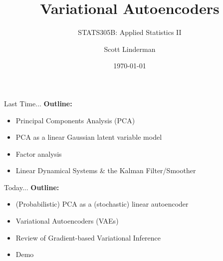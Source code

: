 \documentclass[aspectratio=169]{beamer}
\title{Variational Autoencoders}
\subtitle{STATS305B: Applied  Statistics II}
\author{Scott Linderman}
\date{\today}
\begin{document}
\maketitle

\begin{frame}{Last Time...}
    \textbf{Outline:}
    \begin{itemize}
        \item Principal Components Analysis (PCA)
        \item PCA as a linear Gaussian latent variable model
        \item Factor analysis
        \item Linear Dynamical Systems \& the Kalman Filter/Smoother
    \end{itemize}
    \vspace{1em}
\end{frame}

\begin{frame}{Today...}
    \textbf{Outline:}
    \begin{itemize}
        \item (Probabilistic) PCA as a (stochastic) linear autoencoder
        \item Variational Autoencoders (VAEs)
        \item Review of Gradient-based Variational Inference
        \item Demo
    \end{itemize}
    \vspace{1em}
\end{frame}
\end{document}
